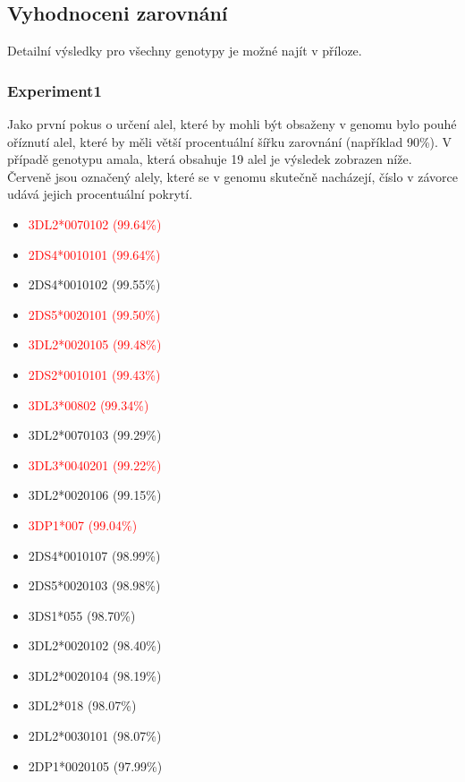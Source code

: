 \documentclass[czech,DP]{thesiskiv}
\numberwithin{equation}{section}
\begin{document}
\subsection{Vyhodnoceni zarovnání}
Detailní výsledky pro všechny genotypy je možné najít v příloze.

\subsubsection{Experiment1}
Jako první pokus o určení alel, které by mohli být obsaženy v genomu bylo pouhé oříznutí alel, které by měli větší procentuální šířku zarovnání (například 90\%).  V případě genotypu amala, která obsahuje 19 alel je výsledek zobrazen níže. Červeně jsou označený alely, které se v genomu skutečně nacházejí, číslo v závorce udává jejich procentuální pokrytí.
\begin{multicols}{2}
\begin{itemize}
	\itemsep0em
	\item \textcolor{red}{3DL2*0070102 (99.64\%) }
	\item \textcolor{red}{2DS4*0010101 (99.64\%) }
	\item 2DS4*0010102 (99.55\%)
	\item \textcolor{red}{2DS5*0020101 (99.50\%) }
	\item \textcolor{red}{3DL2*0020105 (99.48\%) }
	\item \textcolor{red}{2DS2*0010101 (99.43\%) }
	\item \textcolor{red}{3DL3*00802 (99.34\%) }
	\item 3DL2*0070103 (99.29\%) 
	\item \textcolor{red}{3DL3*0040201 (99.22\%) }
	\item 3DL2*0020106 (99.15\%)
	\item \textcolor{red}{3DP1*007 (99.04\%) }
	\item 2DS4*0010107 (98.99\%)
	\item 2DS5*0020103 (98.98\%)
	\item 3DS1*055 (98.70\%)
	\item 3DL2*0020102 (98.40\%)
	\item 3DL2*0020104 (98.19\%)
	\item 3DL2*018 (98.07\%)
	\item 2DL2*0030101 (98.07\%)
	\item 2DP1*0020105 (97.99\%)
\end{itemize}
\end{multicols}
\end{document}
